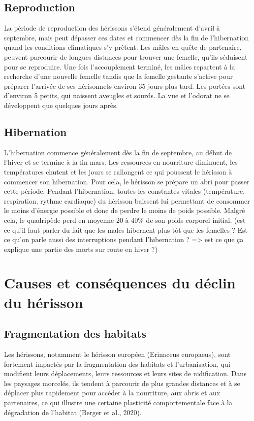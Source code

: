 \documentclass[a4paper,11pt]{article}
\begin{document}
\subsection{Reproduction}
La période de reproduction des hérissons s’étend généralement d’avril à septembre, mais peut dépasser ces dates et commencer dès la fin de l’hibernation quand les conditions climatiques s’y prêtent. Les mâles en quête de partenaire, peuvent parcourir de longues distances pour trouver une femelle, qu’ils séduisent pour se reproduire. Une fois l’accouplement terminé, les mâles repartent à la recherche d’une nouvelle femelle tandis que la femelle gestante s’active pour préparer l’arrivée de ses hérisonnets environ 35 jours plus tard. Les portées sont d’environ 5 petits, qui naissent aveugles et sourds. La vue et l’odorat ne se développent que quelques jours après. 

\subsection{Hibernation}
L’hibernation commence généralement dès la fin de septembre, au début de l’hiver et se termine à la fin mars. Les ressources en nourriture diminuent, les températures chutent et les jours se rallongent ce qui poussent le hérisson à commencer son hibernation. Pour cela, le hérisson se prépare un abri pour passer cette période. Pendant l’hibernation, toutes les constantes vitales (température, respiration, rythme cardiaque) du hérisson baissent lui permettant de consommer le moins d’énergie possible et donc de perdre le moins de poids possible. Malgré cela, le quadripède perd en moyenne 20 à 40\% de son poids corporel initial. (est ce qu’il faut parler du fait que les males hibernent plus tôt que les femelles ? Est-ce qu’on parle aussi des interruptions pendant l’hibernation ? => est ce que ça explique une partie des morts sur route en hiver ?) 

\section{Causes et conséquences du déclin du hérisson}

\subsection{Fragmentation des habitats}

Les hérissons, notamment le hérisson européen (Erinaceus europaeus), sont fortement impactés par la fragmentation des habitats et l’urbanisation, qui modifient leurs déplacements, leurs ressources et leurs sites de nidification. Dans les paysages morcelés, ils tendent à parcourir de plus grandes distances et à se déplacer plus rapidement pour accéder à la nourriture, aux abris et aux partenaires, ce qui illustre une certaine plasticité comportementale face à la dégradation de l’habitat (Berger et al., 2020).
\end{document}
